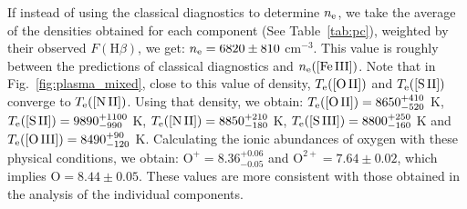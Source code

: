 \documentclass[twocolumn]{aastex63}
\newcommand{\jorge}[1]{{\color{magenta}J: #1}}
\newcommand{\cesar}[1]{{\color{red}C: #1}}
\begin{document}

If instead of using the classical diagnostics to determine $n_{\rm e}$, we take the average of the densities obtained for each component (See Table~\ref{tab:pc}), weighted by their observed $F(\text{H}\beta)$, we get: $n_{\rm e}=6820 \pm 810$ cm$^{-3}$. This value is roughly between the predictions of classical  diagnostics and $n_{\rm e}(\text{[Fe\thinspace III]})$. Note that in Fig.~\ref{fig:plasma_mixed}, close to this value of density, $T_{\rm e}(\text{[O\thinspace II]})$ and $T_{\rm e}(\text{[S\thinspace II]})$ converge to $T_{\rm e}(\text{[N\thinspace II]})$.  Using that density, we obtain: $T_{\rm e}(\text{[O\thinspace II]})=8650^{+410} _{-520}$ K, $T_{\rm e}(\text{[S\thinspace II]})=9890^{+1100} _{-990}$ K, $T_{\rm e}(\text{[N\thinspace II]})=8850^{+210} _{-180}$ K, $T_{\rm e}(\text{[S\thinspace III]})=8800^{+250} _{-160}$ K and $T_{\rm e}(\text{[O\thinspace III]})=8490^{+90} _{-120}$ K. Calculating the ionic abundances of oxygen with these physical conditions, we obtain: $\text{O}^{+}=8.36^{+0.06} _{-0.05}$ and  $\text{O}^{2+}=7.64 \pm 0.02$, which implies $\text{O}=8.44 \pm 0.05$. These values are more consistent with those obtained in the analysis of the individual components. 
\end{document}

